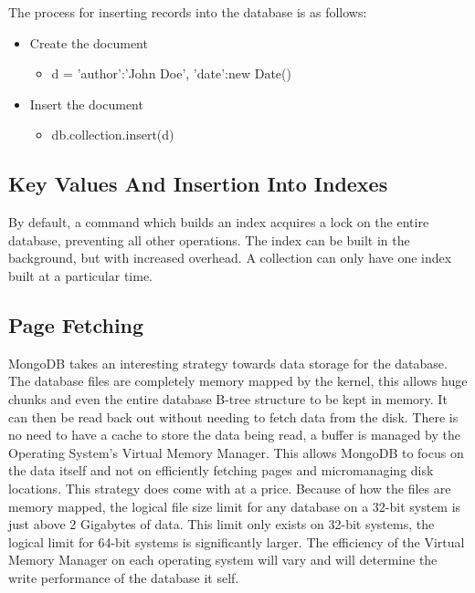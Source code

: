 \documentclass{dependencies/acm_proc_article-sp}
\begin{document}
The process for inserting records into the database is as follows:
\begin{itemize}
  \item Create the document
  \begin{itemize}
    \item d = {'author':'John Doe', 'date':new Date() }
  \end{itemize}

  \item Insert the document
  \begin{itemize}
    \item db.collection.insert(d)
  \end{itemize}
\end{itemize}

\subsection{Key Values And Insertion Into Indexes}
By default, a command which builds an index acquires a lock on the entire database,
preventing all other operations. The index can be built in the background,
but with increased overhead.
A collection can only have one index built at a particular time\cite{7}.
\subsection{Page Fetching}
MongoDB takes an interesting strategy towards data storage for the database.
The database files are completely memory mapped by the kernel, this allows huge chunks and
even the entire database B-tree structure to be kept in memory.
It can then be read back out without needing to fetch data from the disk\cite{16}.
There is no need to have a cache to store the data being read, a buffer is managed
by the Operating System's Virtual Memory Manager. This allows MongoDB to focus on the data itself
and not on efficiently fetching pages and micromanaging disk locations. This strategy does come with
at a price. Because of how the files are memory mapped, the logical file size limit for any database
on a 32-bit system is just above 2 Gigabytes of data. This limit only exists on 32-bit systems, the
logical limit for 64-bit systems is significantly larger. The efficiency of the
Virtual Memory Manager on each operating system will vary and will determine the write performance
of the database it self.
\end{document}
